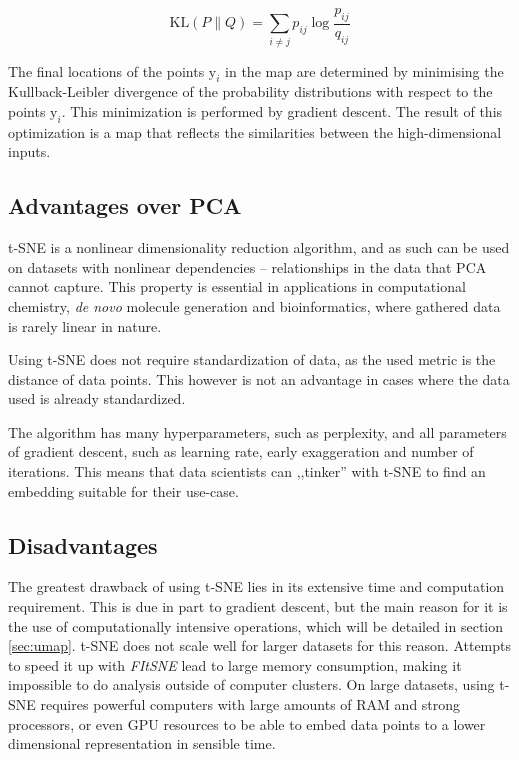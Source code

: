 \begin{equation}
	\label{eq:KLdiv}
 	\mathrm{KL} \left(P \parallel Q \right) = \sum_{i\neq j} p_{ij} \log{\frac{p_{ij}}{q_{ij}}}
\end{equation}

The final locations of the points $\mathrm{y}_i$ in the map are determined by minimising the Kullback-Leibler divergence of the probability distributions with respect to the points $\mathrm{y}_i$. This minimization is performed by gradient descent. The result of this optimization is a map that reflects the similarities between the high-dimensional inputs.

\subsection{Advantages over PCA}

t-SNE is a nonlinear dimensionality reduction algorithm, and as such can be used on datasets with nonlinear dependencies -- relationships in the data that PCA cannot capture. This property is essential in applications in computational chemistry, \textit{de novo} molecule generation and bioinformatics, where gathered data is rarely linear in nature.

Using t-SNE does not require standardization of data, as the used metric is the distance of data points. This however is not an advantage in cases where the data used is already standardized.

The algorithm has many hyperparameters, such as perplexity, and all parameters of gradient descent, such as learning rate, early exaggeration and number of iterations. This means that data scientists can ,,tinker'' with t-SNE to find an embedding suitable for their use-case.

\subsection{Disadvantages}

The greatest drawback of using t-SNE lies in its extensive time and computation requirement. This is due in part to gradient descent, but the main reason for it is the use of computationally intensive operations, which will be detailed in section \ref{sec:umap}. t-SNE does not scale well for larger datasets for this reason. Attempts to speed it up with \textit{FItSNE}\cite{bib:tsne:FItSNE} lead to large memory consumption, making it impossible to do analysis outside of computer clusters. On large datasets, using t-SNE requires powerful computers with large amounts of RAM and strong processors, or even GPU resources to be able to embed data points to a lower dimensional representation in sensible time.

